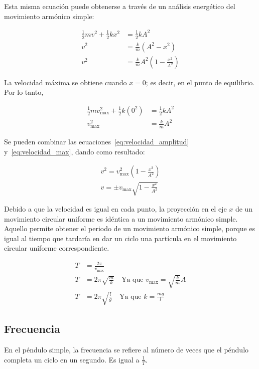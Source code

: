 \documentclass[twocolumn]{article}
\numberwithin{table}{section}
\begin{document}
Esta misma ecuación puede obtenerse a través de un análisis
energético del movimiento armónico simple:

\begin{align}
  \frac{1}{2}mv^{2} + \frac{1}{2}kx^{2} &= \frac{1}{2}kA^{2} \nonumber \\
  v^{2} &= \frac{k}{m}(A^{2} - x^{2}) \nonumber \\
  v^{2} &= \frac{k}{m}A^{2}\left(1 - \frac{x^{2}}{A^{2}}\right)
  \label{eq:velocidad_amplitud}
\end{align}

La velocidad máxima se obtiene cuando $x = 0$; es decir, en el punto de
equilibrio. Por lo tanto,

\begin{align}
  \frac{1}{2}mv_{\max}^{2} + \frac{1}{2}k(0^{2}) &= \frac{1}{2}kA^{2}
  \nonumber \\
  v_{\max}^{2} &= \frac{k}{m}A^{2} \label{eq:velocidad_max}
\end{align}

Se pueden combinar las ecuaciones~\eqref{eq:velocidad_amplitud}
y~\eqref{eq:velocidad_max}, dando como resultado:

\begin{align}
  v^{2} = v^{2}_{\max}\left(1 - \frac{x^{2}}{A^{2}}\right) \nonumber \\
  v = \pm v_{\max}\sqrt{1 - \frac{x^{2}}{A^{2}}}
\end{align}

Debido a que la velocidad es igual en cada punto, la proyección en el
eje $x$ de un movimiento circular uniforme es idéntica a un movimiento armónico
simple. Aquello permite obtener el periodo de un movimiento armónico
simple, porque es igual al tiempo que tardaría en dar un ciclo una
partícula en el movimiento circular uniforme correspondiente.

\begin{align}
  T &= \frac{2\pi}{v_{\max}} \nonumber \\
  T &= 2\pi\sqrt{\frac{m}{k}} \quad \text{Ya que $v_{\max} =
  \sqrt{\frac{k}{m}}A$} \nonumber \\
  T &= 2\pi\sqrt{\frac{l}{g}} \quad \text{Ya que $k =
  \frac{mg}{l}$}\label{eq:periodo}
\end{align}

\subsection{Frecuencia}

En el péndulo simple, la frecuencia se refiere al número de veces que el péndulo
completa un ciclo en un segundo. Es igual a $\frac{1}{T}$.
\end{document}
